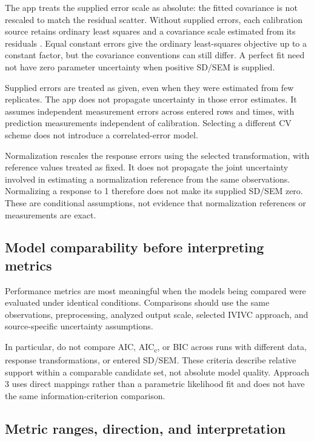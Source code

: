 The app treats the supplied error scale as absolute: the fitted covariance is not rescaled to match the residual scatter. Without supplied errors, each calibration source retains ordinary least squares and a covariance scale estimated from its residuals \cite{scipyCurveFit}. Equal constant errors give the ordinary least-squares objective up to a constant factor, but the covariance conventions can still differ. A perfect fit need not have zero parameter uncertainty when positive SD/SEM is supplied.

Supplied errors are treated as given, even when they were estimated from few replicates. The app does not propagate uncertainty in those error estimates. It assumes independent measurement errors across entered rows and times, with prediction measurements independent of calibration. Selecting a different CV scheme does not introduce a correlated-error model.

Normalization rescales the response errors using the selected transformation, with reference values treated as fixed. It does not propagate the joint uncertainty involved in estimating a normalization reference from the same observations. Normalizing a response to 1 therefore does not make its supplied SD/SEM zero. These are conditional assumptions, not evidence that normalization references or measurements are exact.


\subsection{Model comparability before interpreting metrics}

Performance metrics are most meaningful when the models being compared were evaluated under identical conditions. Comparisons should use the same observations, preprocessing, analyzed output scale, selected IVIVC approach, and source-specific uncertainty assumptions.

In particular, do not compare AIC, AIC\textsubscript{c}, or BIC across runs with different data, response transformations, or entered SD/SEM. These criteria describe relative support within a comparable candidate set, not absolute model quality. Approach 3 uses direct mappings rather than a parametric likelihood fit and does not have the same information-criterion comparison.


\subsection{Metric ranges, direction, and interpretation}

